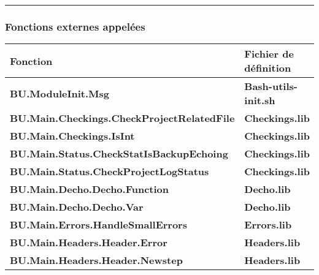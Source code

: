 \documentclass[a4paper,10pt]{article}
\begin{document}
    \setlength{\parskip}{2em}



    \color{sec3}\par\noindent\rule{\textwidth}{0.4pt}\color{text}\setlength{\parskip}{1em}

    \color{sec3}
    \subsubsection{Fonctions externes appelées}\color{text}

    \begin{justify}
        \begin{tabular}{|l|l|}
            \hline
            \textbf{Fonction} & \textbf{Fichier de définition}\\
            \hline
            \textbf{\color{func}BU.ModuleInit.Msg}                           & \textbf{\color{path}Bash-utils-init.sh}\\
            \hline
            \textbf{\color{func}BU.Main.Checkings.CheckProjectRelatedFile}  & \textbf{\color{path}Checkings.lib}\\
            \hline
            \textbf{\color{func}BU.Main.Checkings.IsInt}                                     & \textbf{\color{path}Checkings.lib}\\
            \hline
            \textbf{\color{func}BU.Main.Status.CheckStatIsBackupEchoing}                & \textbf{\color{path}Checkings.lib}\\
            \hline
            \textbf{\color{func}BU.Main.Status.CheckProjectLogStatus}                     & \textbf{\color{path}Checkings.lib}\\
            \hline
            \textbf{\color{func}BU.Main.Decho.Decho.Function}                    & \textbf{\color{path}Decho.lib}\\
            \hline
            \textbf{\color{func}BU.Main.Decho.Decho.Var}                         & \textbf{\color{path}Decho.lib}\\
            \hline
            \textbf{\color{func}BU.Main.Errors.HandleSmallErrors}           & \textbf{\color{path}Errors.lib}\\
            \hline
            \textbf{\color{func}BU.Main.Headers.Header.Error}                               & \textbf{\color{path}Headers.lib}\\
            \hline
            \textbf{\color{func}BU.Main.Headers.Header.Newstep}                             & \textbf{\color{path}Headers.lib}\\

\end{tabular}
\end{justify}
\end{document}
